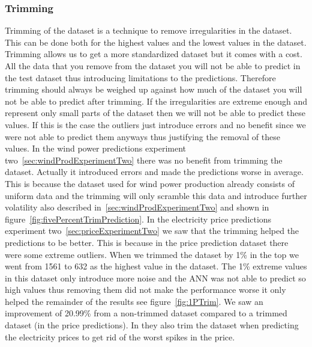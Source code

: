 \subsubsection{Trimming}
Trimming of the dataset is a technique to remove irregularities in the dataset. This can be done both for the highest values and the lowest values in the dataset. Trimming allows us to get a more standardized dataset but it comes with a cost. All the data that you remove from the dataset you will not be able to predict in the test dataset thus introducing limitations to the predictions. Therefore trimming should always be weighed up against how much of the dataset you will not be able to predict after trimming. If the irregularities are extreme enough and represent only small parts of the dataset then we will not be able to predict these values. If this is the case the outliers just introduce errors and no benefit since we were not able to predict them anyways thus justifying the removal of these values. In the wind power predictions experiment two~\ref{sec:windProdExperimentTwo} there was no benefit from trimming the dataset. Actually it introduced errors and made the predictions worse in average. This is because the dataset used for wind power production already consists of uniform data and the trimming will only scramble this data and introduce further volatility also described in~\ref{sec:windProdExperimentTwo} and shown in figure~\ref{fig:fivePercentTrimPrediction}. In the electricity price predictions experiment two~\ref{sec:priceExperimentTwo} we saw that the trimming helped the predictions to be better. This is because in the price prediction dataset there were some extreme outliers. When we trimmed the dataset by 1\% in the top we went from 1561 to 632 as the highest value in the dataset. The 1\% extreme values in this dataset only introduce more noise and the ANN was not able to predict so high values thus removing them did not make the performance worse it only helped the remainder of the results see figure~\ref{fig:1PTrim}. We saw an improvement of 20.99\% from a non-trimmed dataset compared to a trimmed dataset (in the price predictions). In \cite{singhal2011electricity} they also trim the dataset when predicting the electricity prices to get rid of the worst spikes in the price.
